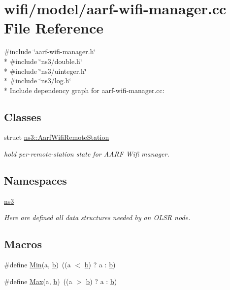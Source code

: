 \hypertarget{aarf-wifi-manager_8cc}{}\section{wifi/model/aarf-\/wifi-\/manager.cc File Reference}
\label{aarf-wifi-manager_8cc}
{\ttfamily \#include \char`\"{}aarf-\/wifi-\/manager.\+h\char`\"{}}\\*
{\ttfamily \#include \char`\"{}ns3/double.\+h\char`\"{}}\\*
{\ttfamily \#include \char`\"{}ns3/uinteger.\+h\char`\"{}}\\*
{\ttfamily \#include \char`\"{}ns3/log.\+h\char`\"{}}\\*
Include dependency graph for aarf-\/wifi-\/manager.cc\+:
\subsection*{Classes}
\begin{DoxyCompactItemize}
\item 
struct \hyperlink{structns3_1_1AarfWifiRemoteStation}{ns3\+::\+Aarf\+Wifi\+Remote\+Station}
\begin{DoxyCompactList}\small\item\em hold per-\/remote-\/station state for A\+A\+RF Wifi manager. \end{DoxyCompactList}\end{DoxyCompactItemize}
\subsection*{Namespaces}
\begin{DoxyCompactItemize}
\item 
 \hyperlink{namespacens3}{ns3}
\begin{DoxyCompactList}\small\item\em Here are defined all data structures needed by an O\+L\+SR node. \end{DoxyCompactList}\end{DoxyCompactItemize}
\subsection*{Macros}
\begin{DoxyCompactItemize}
\item 
\#define \hyperlink{aarf-wifi-manager_8cc_a9e04209162ea72f9985338596262b657}{Min}(a,  \hyperlink{lte__pathloss_8m_a21ad0bd836b90d08f4cf640b4c298e7c}{b})~((a $<$ \hyperlink{lte__pathloss_8m_a21ad0bd836b90d08f4cf640b4c298e7c}{b}) ? a \+: \hyperlink{lte__pathloss_8m_a21ad0bd836b90d08f4cf640b4c298e7c}{b})
\item 
\#define \hyperlink{aarf-wifi-manager_8cc_a4886a8f966a69949cefc46a6a3468006}{Max}(a,  \hyperlink{lte__pathloss_8m_a21ad0bd836b90d08f4cf640b4c298e7c}{b})~((a $>$ \hyperlink{lte__pathloss_8m_a21ad0bd836b90d08f4cf640b4c298e7c}{b}) ? a \+: \hyperlink{lte__pathloss_8m_a21ad0bd836b90d08f4cf640b4c298e7c}{b})
\end{DoxyCompactItemize}
